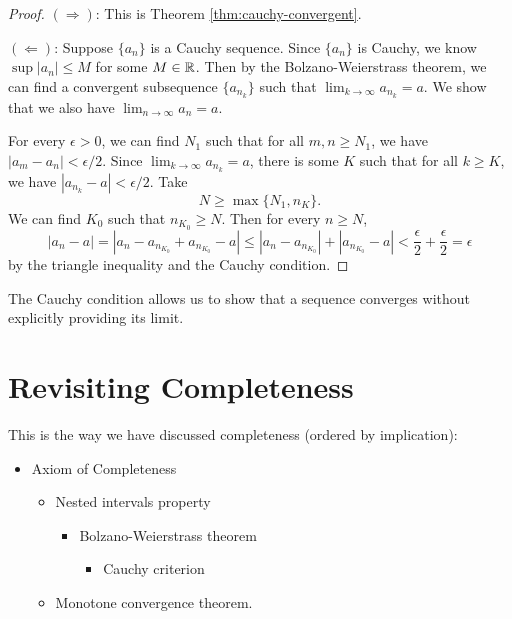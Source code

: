 \begin{proof}\leavevmode\newline
  $(\Longrightarrow)$: This is Theorem \ref{thm:cauchy-convergent}.

  $(\Longleftarrow)$: Suppose $\{a_n\}$ is a Cauchy sequence.
  Since $\{a_n\}$ is Cauchy, we know $\sup |a_n| \le M$
  for some $M \in \mathbb{R}$. Then by the Bolzano-Weierstrass
  theorem, we can find a convergent subsequence
  $\{a_{n_k}\}$ such that
  $\lim_{k \to \infty} a_{n_k} = a$. We show that
  we also have $\lim_{n \to \infty} a_n = a$.

  For every $\epsilon > 0$, we can find $N_1$ such that
  for all $m, n \ge N_1$, we have
  $|a_m - a_n| < \epsilon/2$. Since
  $\lim_{k \to \infty} a_{n_k} = a$, there is some
  $K$ such that for all $k \ge K$, we have
  $|a_{n_k} - a| < \epsilon/2$. Take
  \[N \ge \max\{N_1, n_K\}.\]
  We can find $K_0$ such that $n_{K_0} \ge N$.
  Then for every $n \ge N$,
  \[
    |a_n - a| = |a_n - a_{n_{K_0}} + a_{n_{K_0}} - a|
    \le |a_n - a_{n_{K_0}}| + |a_{n_{K_0}} - a|
    < \frac{\epsilon}{2} + \frac{\epsilon}{2} = \epsilon
  \]
  by the triangle inequality and the Cauchy condition.
\end{proof}

\begin{remark}
  The Cauchy condition allows us to show that a sequence
  converges without explicitly providing its limit.
\end{remark}

\section{Revisiting Completeness}
This is the way we have discussed completeness
(ordered by implication):
\begin{itemize}
  \item Axiom of Completeness
    \begin{itemize}
      \item Nested intervals property
        \begin{itemize}
          \item Bolzano-Weierstrass theorem
            \begin{itemize}
              \item Cauchy criterion
            \end{itemize}
        \end{itemize}
      \item Monotone convergence theorem.
    \end{itemize}
\end{itemize}

